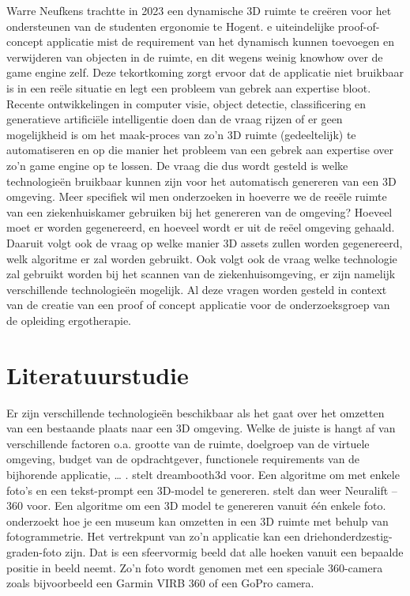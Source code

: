 \documentclass{hogent-article}
\begin{document}
Warre Neufkens trachtte in 2023 een dynamische 3D ruimte te creëren voor het ondersteunen van de studenten ergonomie te Hogent. e uiteindelijke proof-of-concept applicatie mist de requirement van het dynamisch kunnen toevoegen en verwijderen van objecten in de ruimte, en dit wegens weinig knowhow over de game engine zelf. Deze tekortkoming zorgt ervoor dat de applicatie niet bruikbaar is in een reële situatie en legt een probleem van gebrek aan expertise bloot. Recente ontwikkelingen in computer visie, object detectie, classificering en generatieve artificiële intelligentie doen dan de vraag rijzen of er geen mogelijkheid is om het maak-proces van zo’n 3D ruimte (gedeeltelijk) te automatiseren en op die manier het probleem van een gebrek aan expertise over  zo’n game engine op te lossen. De vraag die dus wordt gesteld is welke technologieën bruikbaar kunnen zijn voor het automatisch genereren van een 3D omgeving. Meer specifiek wil men onderzoeken in hoeverre we de reeële ruimte van een ziekenhuiskamer gebruiken bij het genereren van de omgeving? Hoeveel moet er worden gegenereerd, en hoeveel wordt er uit de reëel omgeving gehaald. Daaruit volgt ook de vraag op welke manier 3D assets zullen worden gegenereerd, welk algoritme er zal worden gebruikt. Ook volgt ook de vraag welke technologie zal gebruikt worden bij het scannen van de ziekenhuisomgeving, er zijn namelijk verschillende technologieën mogelijk. Al deze vragen worden gesteld in context van de creatie van een proof of concept applicatie voor de onderzoeksgroep van de opleiding ergotherapie.


\section{Literatuurstudie}%
\label{sec:literatuurstudie}


Er zijn verschillende technologieën beschikbaar als het gaat over het omzetten van een bestaande plaats naar een 3D omgeving. Welke de juiste is hangt af van verschillende factoren o.a. grootte van de ruimte, doelgroep van de virtuele omgeving, budget van de opdrachtgever, functionele requirements van de bijhorende applicatie, … .
\autocite{Raj2023} stelt dreambooth3d voor. Een algoritme om met enkele foto’s en een tekst-prompt  een 3D-model te genereren.
\autocite{Xu2023} stelt dan weer Neuralift – 360 voor.  Een algoritme om een 3D model te genereren vanuit één enkele foto.
\autocite{Martinez2019} onderzoekt hoe je een museum kan omzetten in een 3D ruimte met behulp van fotogrammetrie.
Het vertrekpunt van zo’n applicatie kan een driehonderdzestig-graden-foto zijn. Dat is een sfeervormig beeld dat alle hoeken vanuit een bepaalde positie in beeld neemt. Zo’n foto wordt genomen met een speciale 360-camera zoals bijvoorbeeld een Garmin VIRB 360 of een GoPro camera.
\end{document}
